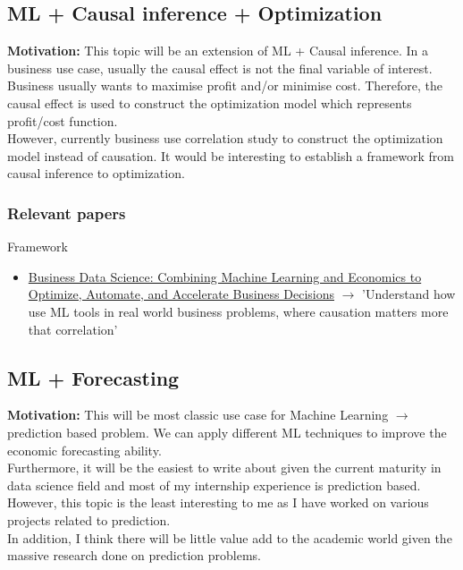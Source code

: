 \documentclass[11pt, oneside]{article}   	%
\begin{document}
    \subsection{ML + Causal inference + Optimization}

    \textbf{Motivation:} This topic will be an extension of ML + Causal inference. In a business use case, usually the
    causal effect is not the final variable of interest. Business usually wants to maximise profit and/or minimise cost.
    Therefore, the causal effect is used to construct the optimization model which represents profit/cost function. \\
    However, currently business use correlation study to construct the optimization model instead of causation. It would
    be interesting to establish a framework from causal inference to optimization.

    \subsubsection{Relevant papers}

    Framework
    \begin{itemize}
        \item \href{https://www.oreilly.com/library/view/business-data-science/9781260452785/}{Business Data Science:
            Combining Machine Learning and Economics to Optimize, Automate, and Accelerate Business Decisions}
            $\rightarrow$ 'Understand how use ML tools in real world business problems, where causation matters more
            that correlation'
    \end{itemize}

    \subsection{ML + Forecasting}

    \textbf{Motivation:} This will be most classic use case for Machine Learning $\rightarrow$ prediction based problem.
    We can apply different ML techniques to improve the economic forecasting ability. \\
    Furthermore, it will be the easiest to write about given the current maturity in data science field 
    and most of my internship experience is prediction based. \\
    However, this topic is the least interesting to me as I have worked on various projects related to prediction. \\
    In addition, I think there will be little value add to the academic world given the massive research done on
    prediction problems.
\end{document}
